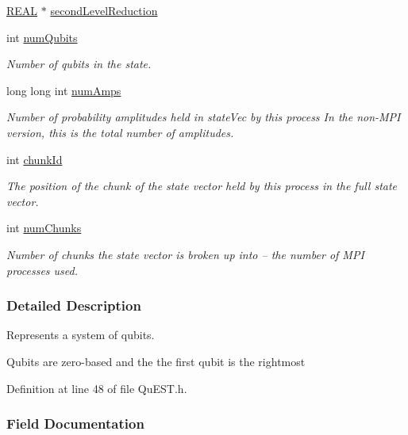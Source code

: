 \begin{DoxyCompactItemize}
\mbox{\hyperlink{QuEST__precision_8h_a4b654506f18b8bfd61ad2a29a7e38c25}{R\+E\+AL}} $\ast$ \mbox{\hyperlink{structMultiQubit_a3e859cefa146ec7b30464ab3d897930b}{second\+Level\+Reduction}}
\item 
int \mbox{\hyperlink{structMultiQubit_ab5b9795bdc6fb5855e1974dcbbaeb36f}{num\+Qubits}}
\begin{DoxyCompactList}\small\item\em Number of qubits in the state. \end{DoxyCompactList}\item 
long long int \mbox{\hyperlink{structMultiQubit_ae16f47d8b725c914fb7f66b6498d79db}{num\+Amps}}
\begin{DoxyCompactList}\small\item\em Number of probability amplitudes held in state\+Vec by this process In the non-\/\+M\+PI version, this is the total number of amplitudes. \end{DoxyCompactList}\item 
int \mbox{\hyperlink{structMultiQubit_ab10c88249fa3825d6227ceec01d37e37}{chunk\+Id}}
\begin{DoxyCompactList}\small\item\em The position of the chunk of the state vector held by this process in the full state vector. \end{DoxyCompactList}\item 
int \mbox{\hyperlink{structMultiQubit_acd43f2f57991709c9e94f73662c972b2}{num\+Chunks}}
\begin{DoxyCompactList}\small\item\em Number of chunks the state vector is broken up into -- the number of M\+PI processes used. \end{DoxyCompactList}\end{DoxyCompactItemize}


\subsubsection{Detailed Description}
Represents a system of qubits. 

Qubits are zero-\/based and the the first qubit is the rightmost 

Definition at line 48 of file Qu\+E\+S\+T.\+h.



\subsubsection{Field Documentation}
\mbox{\label{structMultiQubit_ab10c88249fa3825d6227ceec01d37e37}} 
